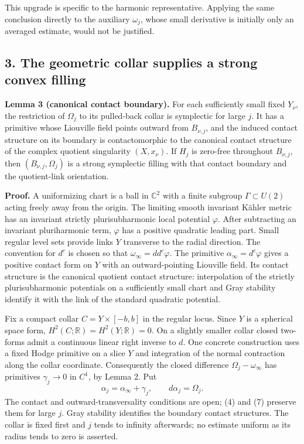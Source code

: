 \documentclass[
  11pt,
]{article}
\begin{document}
This upgrade is specific to the harmonic representative. Applying the
same conclusion directly to the auxiliary \(\omega_j\), whose small
derivative is initially only an averaged estimate, would not be
justified.

\hypertarget{the-geometric-collar-supplies-a-strong-convex-filling}{%
\subsection{3. The geometric collar supplies a strong convex
filling}\label{the-geometric-collar-supplies-a-strong-convex-filling}}

\textbf{Lemma 3 (canonical contact boundary).} For each sufficiently
small fixed \(Y_\nu\), the restriction of \(\Omega_j\) to its
pulled-back collar is symplectic for large \(j\). It has a primitive
whose Liouville field points outward from \(B_{\nu,j}\), and the induced
contact structure on its boundary is contactomorphic to the canonical
contact structure of the complex quotient singularity \((X,x_\nu)\). If
\(H_j\) is zero-free throughout \(B_{\nu,j}\), then
\((B_{\nu,j},\Omega_j)\) is a strong symplectic filling with that
contact boundary and the quotient-link orientation.

\textbf{Proof.} A uniformizing chart is a ball in \(\mathbb C^2\) with a
finite subgroup \(\Gamma\subset U(2)\) acting freely away from the
origin. The limiting smooth invariant Kähler metric has an invariant
strictly plurisubharmonic local potential \(\varphi\). After subtracting
an invariant pluriharmonic term, \(\varphi\) has a positive quadratic
leading part. Small regular level sets provide links \(Y\) transverse to
the radial direction. The convention for \(d^c\) is chosen so that
\(\omega_\infty=dd^c\varphi\). The primitive
\(\alpha_\infty=d^c\varphi\) gives a positive contact form on \(Y\) with
an outward-pointing Liouville field. Its contact structure is the
canonical quotient contact structure: interpolation of the strictly
plurisubharmonic potentials on a sufficiently small chart and Gray
stability identify it with the link of the standard quadratic potential.

Fix a compact collar \(C=Y\times[-b,b]\) in the regular locus. Since
\(Y\) is a spherical space form,
\(H^2(C;\mathbb R)=H^2(Y;\mathbb R)=0\). On a slightly smaller collar
closed two-forms admit a continuous linear right inverse to \(d\). One
concrete construction uses a fixed Hodge primitive on a slice \(Y\) and
integration of the normal contraction along the collar coordinate.
Consequently the closed difference \(\Omega_j-\omega_\infty\) has
primitives \(\gamma_j\to0\) in \(C^1\), by Lemma 2. Put \[
                  \alpha_j=\alpha_\infty+\gamma_j,
             \qquad d\alpha_j=\Omega_j.               \tag{7}
\] The contact and outward-transversality conditions are open; (4) and
(7) preserve them for large \(j\). Gray stability identifies the
boundary contact structures. The collar is fixed first and \(j\) tends
to infinity afterwards; no estimate uniform as its radius tends to zero
is asserted.
\end{document}
